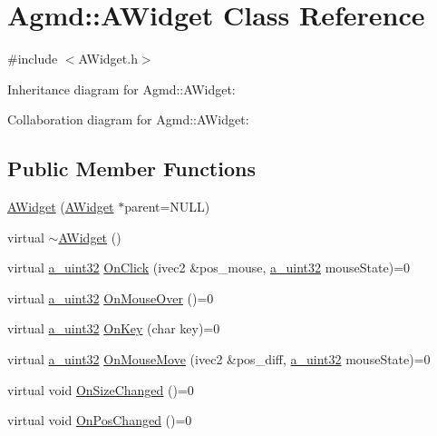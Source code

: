 \hypertarget{class_agmd_1_1_a_widget}{\section{Agmd\+:\+:A\+Widget Class Reference}
\label{class_agmd_1_1_a_widget}
}


{\ttfamily \#include $<$A\+Widget.\+h$>$}



Inheritance diagram for Agmd\+:\+:A\+Widget\+:


Collaboration diagram for Agmd\+:\+:A\+Widget\+:
\subsection*{Public Member Functions}
\begin{DoxyCompactItemize}
\item 
\hyperlink{class_agmd_1_1_a_widget_af5c89814154d8c6813e4c71c7e55dcdf}{A\+Widget} (\hyperlink{class_agmd_1_1_a_widget}{A\+Widget} $\ast$parent=N\+U\+L\+L)
\item 
virtual \hyperlink{class_agmd_1_1_a_widget_accb865d2155a95350af02c15070421a1}{$\sim$\+A\+Widget} ()
\item 
virtual \hyperlink{_common_defines_8h_a964296f9770051b9e4807b1f180dd416}{a\+\_\+uint32} \hyperlink{class_agmd_1_1_a_widget_aff1c3f1dad51042de699456c2a33e84f}{On\+Click} (ivec2 \&pos\+\_\+mouse, \hyperlink{_common_defines_8h_a964296f9770051b9e4807b1f180dd416}{a\+\_\+uint32} mouse\+State)=0
\item 
virtual \hyperlink{_common_defines_8h_a964296f9770051b9e4807b1f180dd416}{a\+\_\+uint32} \hyperlink{class_agmd_1_1_a_widget_a2504dbb651b6458a4733bde00cf029f4}{On\+Mouse\+Over} ()=0
\item 
virtual \hyperlink{_common_defines_8h_a964296f9770051b9e4807b1f180dd416}{a\+\_\+uint32} \hyperlink{class_agmd_1_1_a_widget_a7aa98bc35ca8af51b5d28f7d96c2cba6}{On\+Key} (char key)=0
\item 
virtual \hyperlink{_common_defines_8h_a964296f9770051b9e4807b1f180dd416}{a\+\_\+uint32} \hyperlink{class_agmd_1_1_a_widget_aa9b911c2d4f8506f80bdcfafb5373cc0}{On\+Mouse\+Move} (ivec2 \&pos\+\_\+diff, \hyperlink{_common_defines_8h_a964296f9770051b9e4807b1f180dd416}{a\+\_\+uint32} mouse\+State)=0
\item 
virtual void \hyperlink{class_agmd_1_1_a_widget_a65c040f47c294031a56ad4478e61654c}{On\+Size\+Changed} ()=0
\item 
virtual void \hyperlink{class_agmd_1_1_a_widget_a0ed53f97e67bcb7ed8db276d57c768d2}{On\+Pos\+Changed} ()=0

\end{DoxyCompactItemize}
